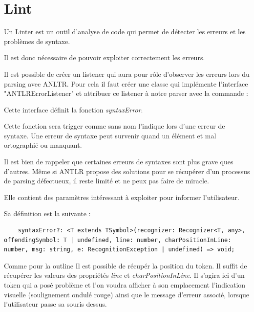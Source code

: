 \documentclass[
    iict, %
    il, %
]{heig-tb}
\begin{document}
\section{Lint}


Un Linter est un outil d'analyse de code qui permet de détecter les erreurs et les problèmes de syntaxe.

Il est donc nécessaire de pouvoir exploiter correctement les erreurs.

Il est possible de créer un listener qui aura pour rôle d'observer les erreurs lors du parsing avec ANLTR.
Pour cela il faut créer une classe qui implémente l'interface "ANTLRErrorListener" et attribuer ce listener à notre parser
avec la commande :

Cette interface définit la fonction \emph{syntaxError}.

Cette fonction sera trigger comme sans nom l'indique lors d'une erreur de syntaxe.
Une erreur de syntaxe peut survenir quand un élément et mal ortographié ou manquant.

Il est bien de rappeler que certaines erreurs de syntaxes sont plus grave ques d'autres.
Même si ANTLR propose des solutions pour se récupérer d'un processus de parsing défectueux, il reste limité et ne peux pas faire de miracle.

Elle contient des paramètres intéressant à exploiter pour informer l'utilisateur.

Sa définition est la suivante :
\begin{lstlisting}
    syntaxError?: <T extends TSymbol>(recognizer: Recognizer<T, any>, offendingSymbol: T | undefined, line: number, charPositionInLine: number, msg: string, e: RecognitionException | undefined) => void;
\end{lstlisting}


Comme pour la outline %
Il est possible de récupér la position du token. Il suffit de récupérer les valeurs des propriétés \emph{line} et \emph{charPositionInLine}.
Il s'agira ici d'un token qui a posé problème et l'on voudra afficher à son emplacement l'indication visuelle (soulignement ondulé rouge) ainsi que le message d'erreur associé, lorsque l'utilisateur passe
sa souris dessus.
\end{document}
